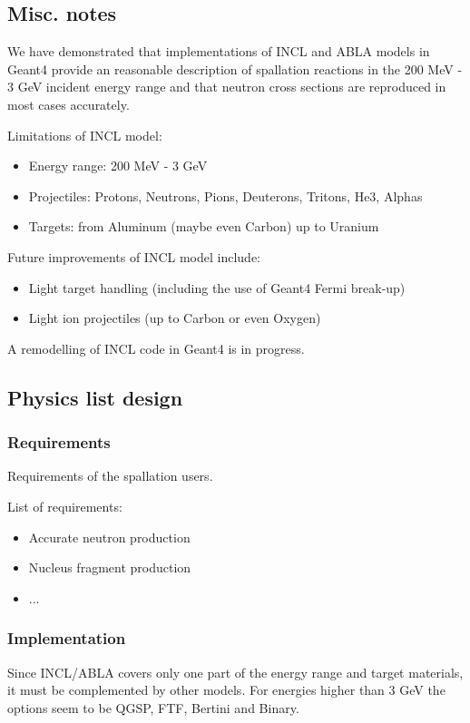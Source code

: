 \begin{appendix}
\section{Misc. notes}
We have demonstrated that implementations of INCL and ABLA models in Geant4 provide
an reasonable description of spallation reactions in the 200 MeV - 3 GeV incident energy range 
and that neutron cross sections are reproduced in most cases accurately.



Limitations of INCL model:
\begin{itemize}
\item Energy range: 200 MeV - 3 GeV
\item Projectiles: Protons, Neutrons, Pions, Deuterons, Tritons, He3, Alphas
\item Targets: from Aluminum (maybe even Carbon) up to Uranium
\end{itemize}

Future improvements of INCL model include:
\begin{itemize}
\item Light target handling (including the use of Geant4 Fermi break-up)
\item Light ion projectiles (up to Carbon or even Oxygen)
\end{itemize}


A remodelling of INCL code in Geant4 is in progress.  

\subsection{Physics list design}

\subsubsection{Requirements}
Requirements of the spallation users.

List of requirements:
\begin{itemize}
\item Accurate neutron production
\item Nucleus fragment production
\item ...
\end{itemize}

\subsubsection{Implementation}
Since INCL/ABLA covers only one part of the energy range and target
materials, it must be complemented by other models. For energies higher
than 3 GeV the options seem to be QGSP, FTF, Bertini and Binary.


\end{appendix}
